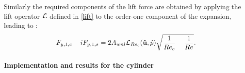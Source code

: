 \documentclass[twocolumn,10pt]{asme2ej}
\newcommand{\be}[1]{ \begin{equation} \label{#1}}
\newcommand{\ee}{\end{equation}}
\begin{document}
Similarly the required components of the lift force are obtained by applying the lift operator ${\cal L}$ defined in \ref{lift} 
to the order-one component of the expansion, leading to :
\be{lift_cos}
F_{y,1,c} - i F_{y,1,s} = 2 A_{wnl} {\cal{L}}_{Re_c}( {\bf \hat{u}},\hat{p} ) \sqrt{\frac{1}{Re_c}-\frac{1}{Re}}.
\ee





\paragraph{Implementation and results for the cylinder}
\end{document}
